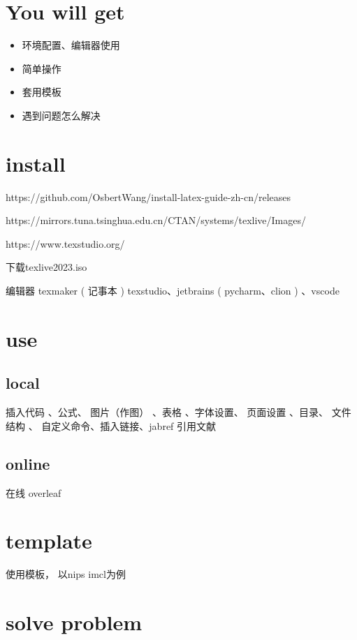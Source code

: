 \documentclass[11pt]{ctexart}
\begin{document}
	
\section{You will get}

\begin{itemize}
	\item 环境配置、编辑器使用
	\item 简单操作
	\item 套用模板
	\item  遇到问题怎么解决
\end{itemize}


\section{install}

https://github.com/OsbertWang/install-latex-guide-zh-cn/releases

https://mirrors.tuna.tsinghua.edu.cn/CTAN/systems/texlive/Images/

https://www.texstudio.org/

下载texlive2023.iso

编辑器 texmaker ( 记事本 ) texstudio、jetbrains ( pycharm、clion ) 、vscode

\section{use}

\subsection{local}
 插入代码 、公式、  图片（作图） 、表格  、字体设置、 页面设置 、目录、 文件结构 、 自定义命令、插入链接、jabref 引用文献 
 
 \subsection{online}
 
 在线 overleaf
 
 \section{template}

使用模板， 以nips imcl为例


\section{solve problem}
\end{document}
